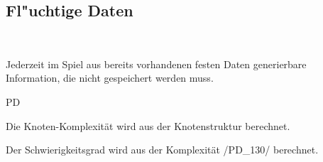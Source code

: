 %
%


\subsection{Fl{"u}chtige Daten}~\\
\label{DT:fluechtDat}

Jederzeit im Spiel aus bereits vorhandenen festen Daten generierbare Information, die nicht gespeichert werden muss.



\begin{ids}{\gls{PD}}

	\id[130] Die Knoten-Komplexität wird aus der Knotenstruktur berechnet.
	
	\id[140] Der Schwierigkeitsgrad wird aus der Komplexität /PD\_130/ berechnet.
		

\end{ids}





